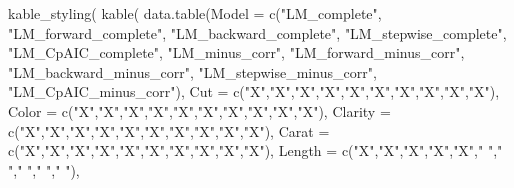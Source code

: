 \documentclass[
]{article}
\newenvironment{Shaded}{\begin{snugshade}}{\end{snugshade}}
\newcommand{\AttributeTok}[1]{\textcolor[rgb]{0.77,0.63,0.00}{#1}}
\newcommand{\FunctionTok}[1]{\textcolor[rgb]{0.00,0.00,0.00}{#1}}
\newcommand{\NormalTok}[1]{#1}
\newcommand{\StringTok}[1]{\textcolor[rgb]{0.31,0.60,0.02}{#1}}
\begin{document}
\begin{Shaded}
\begin{Highlighting}[]
\FunctionTok{kable\_styling}\NormalTok{(}
  \FunctionTok{kable}\NormalTok{(}
  \FunctionTok{data.table}\NormalTok{(}\AttributeTok{Model =} \FunctionTok{c}\NormalTok{(}\StringTok{"LM\_complete"}\NormalTok{, }\StringTok{"LM\_forward\_complete"}\NormalTok{, }\StringTok{"LM\_backward\_complete"}\NormalTok{,}
                       \StringTok{"LM\_stepwise\_complete"}\NormalTok{, }\StringTok{"LM\_CpAIC\_complete"}\NormalTok{,}
                       \StringTok{"LM\_minus\_corr"}\NormalTok{, }\StringTok{"LM\_forward\_minus\_corr"}\NormalTok{, }\StringTok{"LM\_backward\_minus\_corr"}\NormalTok{,}
                       \StringTok{"LM\_stepwise\_minus\_corr"}\NormalTok{, }\StringTok{"LM\_CpAIC\_minus\_corr"}\NormalTok{),}
             \AttributeTok{Cut           =} \FunctionTok{c}\NormalTok{(}\StringTok{"X"}\NormalTok{,}\StringTok{"X"}\NormalTok{,}\StringTok{"X"}\NormalTok{,}\StringTok{"X"}\NormalTok{,}\StringTok{"X"}\NormalTok{,}\StringTok{"X"}\NormalTok{,}\StringTok{"X"}\NormalTok{,}\StringTok{"X"}\NormalTok{,}\StringTok{"X"}\NormalTok{,}\StringTok{"X"}\NormalTok{),}
             \AttributeTok{Color         =} \FunctionTok{c}\NormalTok{(}\StringTok{"X"}\NormalTok{,}\StringTok{"X"}\NormalTok{,}\StringTok{"X"}\NormalTok{,}\StringTok{"X"}\NormalTok{,}\StringTok{"X"}\NormalTok{,}\StringTok{"X"}\NormalTok{,}\StringTok{"X"}\NormalTok{,}\StringTok{"X"}\NormalTok{,}\StringTok{"X"}\NormalTok{,}\StringTok{"X"}\NormalTok{),}
             \AttributeTok{Clarity       =} \FunctionTok{c}\NormalTok{(}\StringTok{"X"}\NormalTok{,}\StringTok{"X"}\NormalTok{,}\StringTok{"X"}\NormalTok{,}\StringTok{"X"}\NormalTok{,}\StringTok{"X"}\NormalTok{,}\StringTok{"X"}\NormalTok{,}\StringTok{"X"}\NormalTok{,}\StringTok{"X"}\NormalTok{,}\StringTok{"X"}\NormalTok{,}\StringTok{"X"}\NormalTok{),}
             \AttributeTok{Carat         =} \FunctionTok{c}\NormalTok{(}\StringTok{"X"}\NormalTok{,}\StringTok{"X"}\NormalTok{,}\StringTok{"X"}\NormalTok{,}\StringTok{"X"}\NormalTok{,}\StringTok{"X"}\NormalTok{,}\StringTok{"X"}\NormalTok{,}\StringTok{"X"}\NormalTok{,}\StringTok{"X"}\NormalTok{,}\StringTok{"X"}\NormalTok{,}\StringTok{"X"}\NormalTok{),}
             \AttributeTok{Length        =} \FunctionTok{c}\NormalTok{(}\StringTok{"X"}\NormalTok{,}\StringTok{"X"}\NormalTok{,}\StringTok{"X"}\NormalTok{,}\StringTok{"X"}\NormalTok{,}\StringTok{"X"}\NormalTok{,}\StringTok{" "}\NormalTok{,}\StringTok{" "}\NormalTok{,}\StringTok{" "}\NormalTok{,}\StringTok{" "}\NormalTok{,}\StringTok{" "}\NormalTok{),}

\end{Highlighting}
\end{Shaded}
\end{document}

